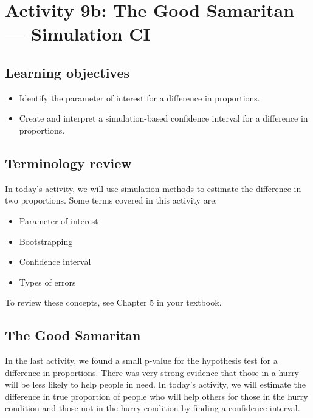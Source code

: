 \documentclass[
]{report}
\begin{document}
\newpage

\hypertarget{activity-9b-the-good-samaritan-simulation-ci}{%
\section{Activity 9b: The Good Samaritan --- Simulation CI}\label{activity-9b-the-good-samaritan-simulation-ci}}


\hypertarget{learning-objectives-13}{%
\subsection{Learning objectives}\label{learning-objectives-13}}

\begin{itemize}
\item
  Identify the parameter of interest for a difference in proportions.
\item
  Create and interpret a simulation-based confidence interval for a difference in proportions.
\end{itemize}

\hypertarget{terminology-review-16}{%
\subsection{Terminology review}\label{terminology-review-16}}

In today's activity, we will use simulation methods to estimate the difference in two proportions. Some terms covered in this activity are:

\begin{itemize}
\item
  Parameter of interest
\item
  Bootstrapping
\item
  Confidence interval
\item
  Types of errors
\end{itemize}

To review these concepts, see Chapter 5 in your textbook.

\hypertarget{the-good-samaritan-1}{%
\subsection{The Good Samaritan}\label{the-good-samaritan-1}}

In the last activity, we found a small p-value for the hypothesis test for a difference in proportions. There was very strong evidence that those in a hurry will be less likely to help people in need. In today's activity, we will estimate the difference in true proportion of people who will help others for those in the hurry condition and those not in the hurry condition by finding a confidence interval.
\end{document}
